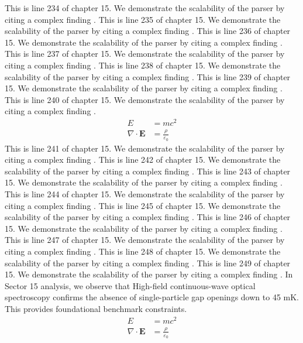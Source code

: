 This is line 234 of chapter 15. We demonstrate the scalability of the parser by citing a complex finding \cite{ref15_234}.
This is line 235 of chapter 15. We demonstrate the scalability of the parser by citing a complex finding \cite{ref15_235}.
This is line 236 of chapter 15. We demonstrate the scalability of the parser by citing a complex finding \cite{ref15_236}.
This is line 237 of chapter 15. We demonstrate the scalability of the parser by citing a complex finding \cite{ref15_237}.
This is line 238 of chapter 15. We demonstrate the scalability of the parser by citing a complex finding \cite{ref15_238}.
This is line 239 of chapter 15. We demonstrate the scalability of the parser by citing a complex finding \cite{ref15_239}.
This is line 240 of chapter 15. We demonstrate the scalability of the parser by citing a complex finding \cite{ref15_240}.
\begin{align*}
  E &= mc^2 \\
  \nabla \cdot \mathbf{E} &= \frac{\rho}{\varepsilon_0}
\end{align*}
This is line 241 of chapter 15. We demonstrate the scalability of the parser by citing a complex finding \cite{ref15_241}.
This is line 242 of chapter 15. We demonstrate the scalability of the parser by citing a complex finding \cite{ref15_242}.
This is line 243 of chapter 15. We demonstrate the scalability of the parser by citing a complex finding \cite{ref15_243}.
This is line 244 of chapter 15. We demonstrate the scalability of the parser by citing a complex finding \cite{ref15_244}.
This is line 245 of chapter 15. We demonstrate the scalability of the parser by citing a complex finding \cite{ref15_245}.
This is line 246 of chapter 15. We demonstrate the scalability of the parser by citing a complex finding \cite{ref15_246}.
This is line 247 of chapter 15. We demonstrate the scalability of the parser by citing a complex finding \cite{ref15_247}.
This is line 248 of chapter 15. We demonstrate the scalability of the parser by citing a complex finding \cite{ref15_248}.
This is line 249 of chapter 15. We demonstrate the scalability of the parser by citing a complex finding \cite{ref15_249}.
In Sector 15 analysis, we observe that High-field continuous-wave optical spectroscopy confirms the absence of single-particle gap openings down to 45 mK. This provides foundational benchmark constraints.
\begin{align*}
  E &= mc^2 \\
  \nabla \cdot \mathbf{E} &= \frac{\rho}{\varepsilon_0}
\end{align*}
